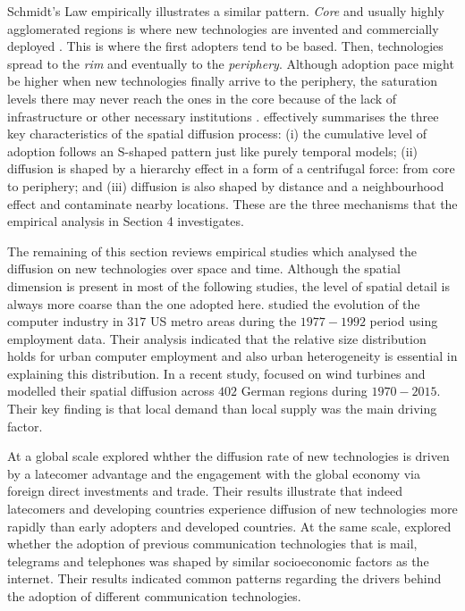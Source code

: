 \documentclass[
  authoryear,
  preprint,
  3p]{elsarticle}
\begin{document}
Schmidt's Law empirically illustrates a similar pattern. \emph{Core} and
usually highly agglomerated regions is where new technologies are
invented and commercially deployed \citep{grubler1990rise}. This is
where the first adopters tend to be based. Then, technologies spread to
the \emph{rim} and eventually to the \emph{periphery}. Although adoption
pace might be higher when new technologies finally arrive to the
periphery, the saturation levels there may never reach the ones in the
core because of the lack of infrastructure or other necessary
institutions \citep{leibowicz2016representing}. \citet{grubler1990rise}
effectively summarises the three key characteristics of the spatial
diffusion process: (i) the cumulative level of adoption follows an
S-shaped pattern just like purely temporal models; (ii) diffusion is
shaped by a hierarchy effect in a form of a centrifugal force: from core
to periphery; and (iii) diffusion is also shaped by distance and a
neighbourhood effect and contaminate nearby locations. These are the
three mechanisms that the empirical analysis in Section
\label{sec4}{4} investigates.

The remaining of this section reviews empirical studies which analysed
the diffusion on new technologies over space and time. Although the
spatial dimension is present in most of the following studies, the level
of spatial detail is always more coarse than the one adopted here.
\citet{beardsell1999spatial} studied the evolution of the computer
industry in \(317\) US metro areas during the \(1977-1992\) period using
employment data. Their analysis indicated that the relative size
distribution holds for urban computer employment and also urban
heterogeneity is essential in explaining this distribution. In a recent
study, \citet{bednarz2020pulled} focused on wind turbines and modelled
their spatial diffusion across \(402\) German regions during
\(1970-2015\). Their key finding is that local demand than local supply
was the main driving factor.

At a global scale \citet{perkins2005international} explored whther the
diffusion rate of new technologies is driven by a latecomer advantage
and the engagement with the global economy via foreign direct
investments and trade. Their results illustrate that indeed latecomers
and developing countries experience diffusion of new technologies more
rapidly than early adopters and developed countries. At the same scale,
\citet{perkins2011internet} explored whether the adoption of previous
communication technologies that is mail, telegrams and telephones was
shaped by similar socioeconomic factors as the internet. Their results
indicated common patterns regarding the drivers behind the adoption of
different communication technologies.
\end{document}
